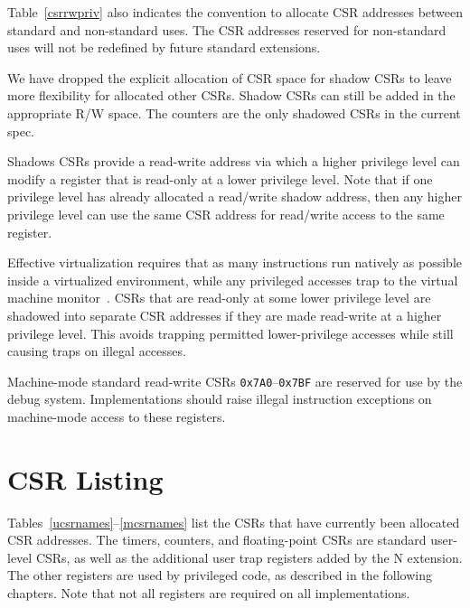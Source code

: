 Table~\ref{csrrwpriv} also indicates the convention to allocate CSR
addresses between standard and non-standard uses.  The CSR addresses
reserved for non-standard uses will not be redefined by future
standard extensions.

\begin{commentary}
We have dropped the explicit allocation of CSR space for shadow CSRs
to leave more flexibility for allocated other CSRs. Shadow CSRs can
still be added in the appropriate R/W space.  The counters are the
only shadowed CSRs in the current spec.

Shadows CSRs provide a read-write address via which a higher privilege
level can modify a register that is read-only at a lower privilege
level.  Note that if one privilege level has already allocated a
read/write shadow address, then any higher privilege level can use the
same CSR address for read/write access to the same register.
  
Effective virtualization requires that as many instructions run
natively as possible inside a virtualized environment, while any
privileged accesses trap to the virtual machine
monitor~\cite{goldbergvm}.  CSRs that are read-only at some lower
privilege level are shadowed into separate CSR addresses if they are
made read-write at a higher privilege level.  This avoids trapping
permitted lower-privilege accesses while still causing traps on
illegal accesses.
\end{commentary}

Machine-mode standard read-write CSRs {\tt 0x7A0}--{\tt 0x7BF} are
reserved for use by the debug system.  Implementations should raise
illegal instruction exceptions on machine-mode access to these registers.

\section{CSR Listing}

Tables~\ref{ucsrnames}--\ref{mcsrnames} list the CSRs that have
currently been allocated CSR addresses.  The timers, counters, and
floating-point CSRs are standard user-level CSRs, as well as the
additional user trap registers added by the N extension.  The other
registers are used by privileged code, as described in the following
chapters.  Note that not all registers are required on all
implementations.

